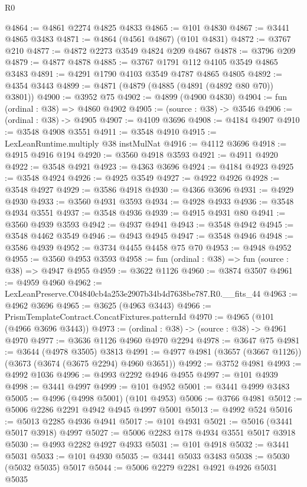 \begin{lexlean}{R0}
\begin{coremodule}
@4864 := @4861 @2274 @4825 @4833
@4865 := @101 @4830
@4867 := @3441 @4865 @3483
@4871 := @4864 (@4561 @4867) (@101 @4831)
@4872 := @3767 @210
@4877 := @4872 @2273 @3549 @4824 @209 @4867
@4878 := @3796 @209
@4879 := @4877 @4878
@4885 := @3767 @1791 @112 @4105 @3549 @4865 @3483
@4891 := @4291 @1790 @4103 @3549 @4787 @4865 @4805
@4892 := @4354 @3443
@4899 := @4871 (@4879 (@4885 (@4891 (@4892 @80 @70)) @3801))
@4900 := @3952 @75
@4902 := @4899 (@4900 @4830)
@4904 := fun (ordinal : @38) => @4860 @4902
@4905 := (source : @38) -> @3546
@4906 := (ordinal : @38) -> @4905
@4907 := @4109 @3696
@4908 := @4184 @4907
@4910 := @3548 @4908 @3551
@4911 := @3548 @4910
@4915 := LexLeanRuntime.multiply @38 instMulNat
@4916 := @4112 @3696
@4918 := @4915 @4916 @194
@4920 := @3560 @4918 @3593
@4921 := @4911 @4920
@4922 := @3548 @4921
@4923 := @4363 @3696
@4924 := @4184 @4923
@4925 := @3548 @4924
@4926 := @4925 @3549
@4927 := @4922 @4926
@4928 := @3548 @4927
@4929 := @3586 @4918
@4930 := @4366 @3696
@4931 := @4929 @4930
@4933 := @3560 @4931 @3593
@4934 := @4928 @4933
@4936 := @3548 @4934 @3551
@4937 := @3548 @4936
@4939 := @4915 @4931 @80
@4941 := @3560 @4939 @3593
@4942 := @4937 @4941
@4943 := @3548 @4942
@4945 := @3548 @4462 @3549
@4946 := @4943 @4945
@4947 := @3548 @4946
@4948 := @3586 @4939
@4952 := @3734 @4455 @4458 @75 @70
@4953 := @4948 @4952
@4955 := @3560 @4953 @3593
@4958 := fun (ordinal : @38) => fun (source : @38) => @4947 @4955
@4959 := @3622 @1126
@4960 := @3874 @3507
@4961 := @4959 @4960
@4962 := LexLeanPreserve.C04840cb4a253e2907b34b4d7638be787.R0.__fits_44
@4963 := @4962 @3696
@4965 := @3625 (@4963 @3443)
@4966 := PrismTemplateContract.ConcatFixtures.patternId
@4970 := @4965 (@101 (@4966 @3696 @3443))
@4973 := (ordinal : @38) -> (source : @38) -> @4961 @4970
@4977 := @3636 @1126 @4960 @4970 @2294
@4978 := @3647 @75
@4981 := @3644 (@4978 @3505) @3813
@4991 := @4977 @4981 (@3657 (@3667 @1126)) (@3673 (@3674 (@3675 @2294) @4960 @3651))
@4992 := @3752 @4981
@4993 := @4992 @1036
@4996 := @4993 @2292 @4946 @4955
@4997 := @101 @4939
@4998 := @3441 @4997
@4999 := @101 @4952
@5001 := @3441 @4999 @3483
@5005 := @4996 (@4998 @5001) (@101 @4953)
@5006 := @3766 @4981
@5012 := @5006 @2286 @2291 @4942 @4945 @4997 @5001
@5013 := @4992 @524
@5016 := @5013 @2285 @4936 @4941
@5017 := @101 @4931
@5021 := @5016 (@3441 @5017 @3918) @4997
@5027 := @5006 @2283 @178 @4934 @3551 @5017 @3918
@5030 := @4993 @2282 @4927 @4933
@5031 := @101 @4918
@5032 := @3441 @5031
@5033 := @101 @4930
@5035 := @3441 @5033 @3483
@5038 := @5030 (@5032 @5035) @5017
@5044 := @5006 @2279 @2281 @4921 @4926 @5031 @5035

\end{coremodule}
\end{lexlean}
